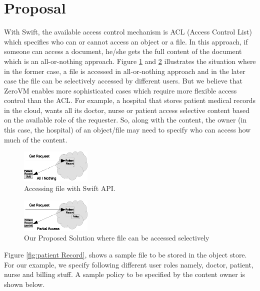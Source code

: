 \section{Proposal}

With Swift, the available access control mechanism is  ACL (Access Control List) which specifies who can or cannot access an object or a file. In this approach, if someone can access a document, he/she gets the full content of the document which is an all-or-nothing approach.  Figure \ref{fig:swiftfile} and \ref{fig:zwiftfile}  illustrates the situation where in the former case, a file is accessed in all-or-nothing approach and in the later case the file can be selectively accessed by different users. But we believe that   ZeroVM enables more sophisticated cases which require more flexible access control than the ACL. For example,  a hospital that stores patient medical records in the cloud,  wants all its doctor, nurse or patient access selective content based on the available role of the requester.  So, along with the content, the owner (in this case, the hospital) of an object/file may need to specify who can access how much of the content.

\begin{figure}[h!] 
  \centering
    \includegraphics[width=0.3\textwidth]{eps/swift_file}
 \caption{Accessing file with Swift API.}
\label{fig:swiftfile}
\end{figure}

\begin{figure}[h!]
  \centering
    \includegraphics[width=0.3\textwidth]{eps/zwift_file}
 \caption{Our Proposed Solution where file can be accessed selectively}
\label {fig:zwiftfile} 
\end{figure}




Figure  \ref{fig:patient Record}, shows a sample file to be stored in the object store. For our example, we specify following different user roles namely, doctor, patient, nurse and billing stuff.
A sample policy to be specified by the content owner is shown below.

